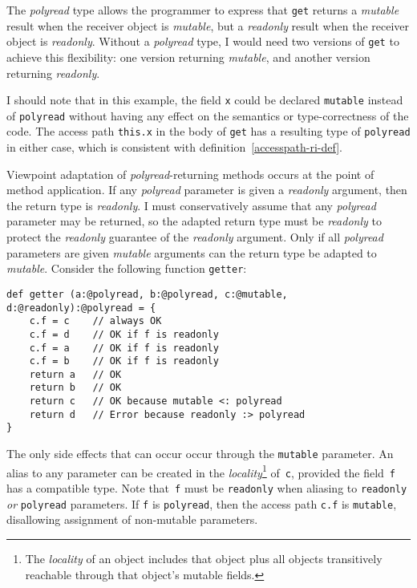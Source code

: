 \documentclass[letterpaper,11pt]{article}
\newcommand{\code}[1]{\lstinline$#1$}
\theoremstyle{definition}
\theoremstyle{remark}
\begin{document}
The \emph{polyread} type allows the programmer to express that \code{get} returns a \emph{mutable}
result when the receiver object is \emph{mutable},
but a \emph{readonly} result when the receiver object is \emph{readonly}.
Without a \emph{polyread} type, I would need two versions of \code{get}
to achieve this flexibility: one version returning \emph{mutable}, and
another version returning \emph{readonly}.

I should note that in this example, the field \code{x} could be declared \code{mutable}
instead of \code{polyread} without having any effect on the semantics or type-correctness
of the code. The access path \code{this.x} in the body of \code{get} has a resulting type
of \code{polyread} in either case, which is consistent with definition~\ref{accesspath-ri-def}.


Viewpoint adaptation of \emph{polyread}-returning methods
occurs at the point of method application.
If any \emph{polyread} parameter is given a \emph{readonly} argument,
then the return type is \emph{readonly}.
I must conservatively assume that any \emph{polyread} parameter may be
returned,
so the adapted return type must be \emph{readonly} to protect the \emph{readonly} guarantee
of the \emph{readonly} argument.
Only if all \emph{polyread} parameters are given \emph{mutable} arguments
can the return type be adapted to \emph{mutable}.
Consider the following function \code{getter}:

\begin{lstlisting}
def getter (a:@polyread, b:@polyread, c:@mutable, d:@readonly):@polyread = {
	c.f = c    // always OK
	c.f = d    // OK if f is readonly
	c.f = a    // OK if f is readonly
	c.f = b    // OK if f is readonly
	return a   // OK
	return b   // OK
	return c   // OK because mutable <: polyread
	return d   // Error because readonly :> polyread
}
\end{lstlisting}

The only side effects that can occur occur through the \code{mutable}
parameter. An alias to any parameter can be created in the \emph{locality}\footnote{
The \emph{locality} of an object includes that object plus all objects transitively reachable
through that object's mutable fields.
}
of~\code{c}, provided the field~\code{f} has a compatible type.
Note that~\code{f} must be \code{readonly} when aliasing to \code{readonly} \emph{or} \code{polyread}
parameters. If \code{f} is \code{polyread}, then the access path \code{c.f} is \code{mutable},
disallowing assignment of non-mutable parameters.
\end{document}
